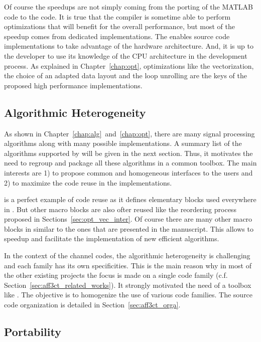 Of course the speedups are not simply coming from the porting of the MATLAB
code to the \Cxx code. It is true that the compiler is sometime able to perform
optimizations that will benefit for the overall performance, but most of the
speedup comes from dedicated implementations. The \Cxx enables source code
implementations to take advantage of the hardware architecture. And, it is up
to the developer to use its knowledge of the CPU architecture in the development
process. As explained in Chapter~\ref{chap:opt}, optimizations like the
vectorization, the choice of an adapted data layout and the loop unrolling are
the keys of the proposed high performance implementations.

\subsection{Algorithmic Heterogeneity}

As shown in Chapter~\ref{chap:alg}~and~\ref{chap:opt}, there are many signal
processing algorithms along with many possible implementations. A summary list
of the algorithms supported by \AFFECT will be given in the next section. Thus,
it motivates the need to regroup and package all these algorithms in a common
toolbox. The main interests are 1) to propose common and homogeneous interfaces
to the users and 2) to maximize the code reuse in the implementations.

\MIPP is a perfect example of code reuse as it defines elementary blocks used
everywhere in \AFFECT. But other macro blocks are also ofter reused like the
reordering process proposed in Sections~\ref{sec:opt_vec_inter}. Of course there
are many other macro blocks in \AFFECT similar to the ones that are presented in
the manuscript. This allows to speedup and facilitate the implementation of new
efficient algorithms.

In the context of the channel codes, the algorithmic heterogeneity is
challenging and each family has its own specificities. This is the main reason
why in most of the other existing projects the focus is made on a single code
family (c.f. Section~\ref{sec:aff3ct_related_works}). It strongly motivated
the need of a toolbox like \AFFECT. The objective is to homogenize the use of
various code families. The \AFFECT source code organization is detailed in
Section~\ref{sec:aff3ct_orga}.

\subsection{Portability}

